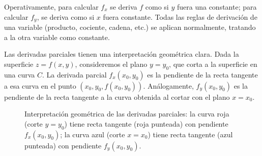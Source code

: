 \begin{rem}
Operativamente, para calcular $f_x$ se deriva $f$ como si $y$ fuera
una constante; para calcular $f_y$, se deriva como si $x$ fuera
constante. Todas las reglas de derivación de una variable (producto,
cociente, cadena, etc.) se aplican normalmente, tratando a la otra
variable como constante.
\end{rem}


Las derivadas parciales tienen una interpretación geométrica clara.
Dada la superficie $z=f(x,y)$, consideremos el plano $y=y_0$, que
corta a la superficie en una curva $C$. La derivada parcial
$f_x(x_0,y_0)$ es la pendiente de la recta tangente a esa curva en
el punto $(x_0,y_0,f(x_0,y_0))$. Análogamente, $f_y(x_0,y_0)$ es la
pendiente de la recta tangente a la curva obtenida al cortar con el
plano $x=x_0$.

\begin{figure}[!htbp]
\centering
{}
\caption{Interpretación geométrica de las derivadas parciales: la curva roja (corte $y=y_0$) tiene recta tangente (roja punteada) con pendiente $f_x(x_0,y_0)$; la curva azul (corte $x=x_0$) tiene recta tangente (azul punteada) con pendiente $f_y(x_0,y_0)$.}
\label{fig:dp_interpretacion_geometrica}
\end{figure}

